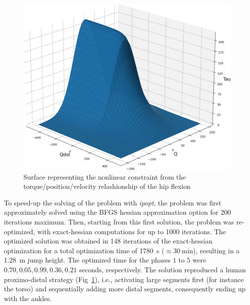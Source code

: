 \begin{figure}[h!]
\includegraphics[width=\columnwidth]{figures/torque_angle_velocity_hip_flexion}
\caption{Surface representing the nonlinear constraint from the torque/position/velocity relashionship of the hip flexion} 
\label{fig:graph_force_vitesse_longueur}
\end{figure}

To speed-up the solving of the problem with \emph{ipopt}, the problem was first approximately solved using the BFGS hessian approximation option for 200 iterations maximum.
Then, starting from this first solution, the problem was re-optimized, with exact-hessian computations for up to 1000 iterations.
The optimized solution was obtained in 148 iterations of the exact-hessian optimization for a total optimization time of \SI{1780}{\second} ($\approx\SI{30}{\minute}$), resulting in a \SI{1.28}{\meter} jump height.
The optimized time for the phases $1$ to $5$ were $0.70, 0.05, 0.99, 0.36, 0.21$ seconds, respectively.
The solution reproduced a human proximo-distal strategy (Fig~\ref{fig:graph_force_vitesse_longueur}), i.e., activating large segments first (for instance the torso) and sequentially adding more distal segments, consequently ending up with the ankles.


